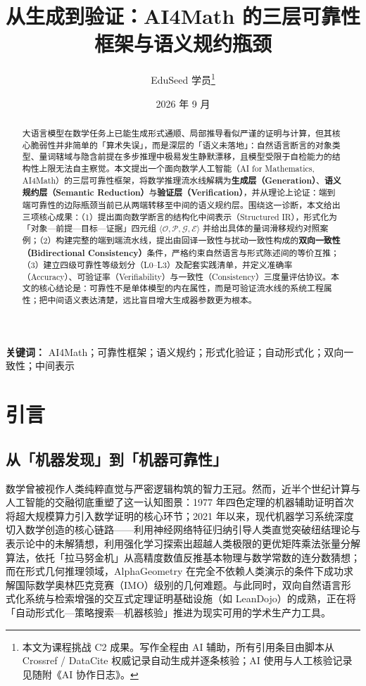 ﻿\documentclass[UTF8,a4paper,11pt]{ctexart}
\title{\textbf{从生成到验证：AI4Math 的三层可靠性框架与语义规约瓶颈}}
\author{EduSeed 学员\thanks{本文为课程挑战 C2 成果。写作全程由 AI 辅助，所有引用条目由脚本从 Crossref / DataCite 权威记录自动生成并逐条核验；AI 使用与人工核验记录见随附《AI 协作日志》。}}
\date{2026 年 9 月}
\theoremstyle{definition}
\begin{document}
\maketitle

\begin{abstract}
大语言模型在数学任务上已能生成形式通顺、局部推导看似严谨的证明与计算，但其核心脆弱性并非简单的「算术失误」，而是深层的「语义未落地」：自然语言断言的对象类型、量词辖域与隐含前提在多步推理中极易发生静默漂移，且模型受限于自检能力的结构性上限无法自主察觉。本文提出一个面向数学人工智能（AI for Mathematics, AI4Math）的三层可靠性框架，将数学推理流水线解耦为\textbf{生成层（Generation）}、\textbf{语义规约层（Semantic Reduction）}与\textbf{验证层（Verification）}，并从理论上论证：端到端可靠性的边际瓶颈当前已从两端转移至中间的语义规约层。围绕这一诊断，本文给出三项核心成果：（1）提出面向数学断言的结构化中间表示（Structured IR），形式化为「对象—前提—目标—证据」四元组 $\langle \mathcal{O}, \mathcal{P}, \mathcal{G}, \mathcal{E} \rangle$ 并给出具体的量词滑移规约对照案例；（2）构建完整的端到端流水线，提出由回译一致性与扰动一致性构成的\textbf{双向一致性（Bidirectional Consistency）}条件，严格约束自然语言与形式陈述间的等价互推；（3）建立四级可靠性等级划分（L0--L3）及配套实践清单，并定义准确率（Accuracy）、可验证率（Verifiability）与一致性（Consistency）三度量评估协议。本文的核心结论是：可靠性不是单体模型的内在属性，而是可验证流水线的系统工程属性；把中间语义表达清楚，远比盲目增大生成器参数更为根本。
\end{abstract}

\noindent\textbf{关键词：} AI4Math；可靠性框架；语义规约；形式化验证；自动形式化；双向一致性；中间表示

\section{引言}
\label{sec:intro}

\subsection{从「机器发现」到「机器可靠性」}
数学曾被视作人类纯粹直觉与严密逻辑构筑的智力王冠。然而，近半个世纪计算与人工智能的交融彻底重塑了这一认知图景：1977 年四色定理的机器辅助证明首次将超大规模算力引入数学证明的核心环节\cite{appel1977}；2021 年以来，现代机器学习系统深度切入数学创造的核心链路——利用神经网络特征归纳引导人类直觉突破纽结理论与表示论中的未解猜想\cite{davies2021}，利用强化学习探索出超越人类极限的更优矩阵乘法张量分解算法\cite{fawzi2022,romera2024}，依托「拉马努金机」从高精度数值反推基本物理与数学常数的连分数猜想\cite{raayoni2021}；而在形式几何推理领域，AlphaGeometry 在完全不依赖人类演示的条件下成功求解国际数学奥林匹克竞赛（IMO）级别的几何难题\cite{trinh2024}。与此同时，双向自然语言形式化系统\cite{wu2022auto,xin2024deepseekprover}与检索增强的交互式定理证明基础设施（如 LeanDojo\cite{yang2023leandojo}）的成熟，正在将「自动形式化—策略搜索—机器核验」推进为现实可用的学术生产力工具。
\end{document}
